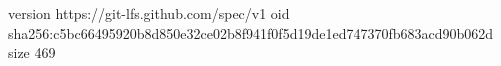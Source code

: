 version https://git-lfs.github.com/spec/v1
oid sha256:c5bc66495920b8d850e32ce02b8f941f0f5d19de1ed747370fb683acd90b062d
size 469
